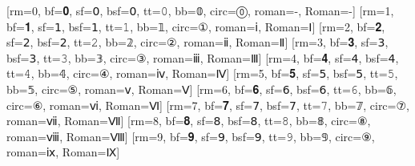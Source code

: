 [rm=0, bf=𝟎, sf=𝟢, bsf=𝟢, tt=𝟶, bb=𝟘, circ=⓪, roman=-, Roman=-]
[rm=1, bf=𝟏, sf=𝟣, bsf=𝟣, tt=𝟷, bb=𝟙, circ=①, roman=ⅰ, Roman=Ⅰ]
[rm=2, bf=𝟐, sf=𝟤, bsf=𝟤, tt=𝟸, bb=𝟚, circ=②, roman=ⅱ, Roman=Ⅱ]
[rm=3, bf=𝟑, sf=𝟥, bsf=𝟥, tt=𝟹, bb=𝟛, circ=③, roman=ⅲ, Roman=Ⅲ]
[rm=4, bf=𝟒, sf=𝟦, bsf=𝟦, tt=𝟺, bb=𝟜, circ=④, roman=ⅳ, Roman=Ⅳ]
[rm=5, bf=𝟓, sf=𝟧, bsf=𝟧, tt=𝟻, bb=𝟝, circ=⑤, roman=ⅴ, Roman=Ⅴ]
[rm=6, bf=𝟔, sf=𝟨, bsf=𝟨, tt=𝟼, bb=𝟞, circ=⑥, roman=ⅵ, Roman=Ⅵ]
[rm=7, bf=𝟕, sf=𝟩, bsf=𝟩, tt=𝟽, bb=𝟟, circ=⑦, roman=ⅶ, Roman=Ⅶ]
[rm=8, bf=𝟖, sf=𝟪, bsf=𝟪, tt=𝟾, bb=𝟠, circ=⑧, roman=ⅷ, Roman=Ⅷ]
[rm=9, bf=𝟗, sf=𝟫, bsf=𝟫, tt=𝟿, bb=𝟡, circ=⑨, roman=ⅸ, Roman=Ⅸ]

